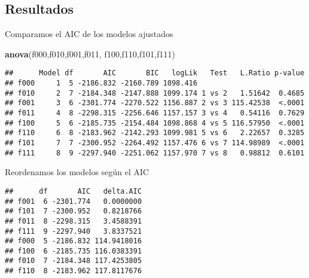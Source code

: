 \documentclass[]{article}
\newenvironment{Shaded}{\begin{snugshade}}{\end{snugshade}}
\newcommand{\DataTypeTok}[1]{\textcolor[rgb]{0.13,0.29,0.53}{#1}}
\newcommand{\DecValTok}[1]{\textcolor[rgb]{0.00,0.00,0.81}{#1}}
\newcommand{\KeywordTok}[1]{\textcolor[rgb]{0.13,0.29,0.53}{\textbf{#1}}}
\newcommand{\NormalTok}[1]{#1}
\newcommand{\OperatorTok}[1]{\textcolor[rgb]{0.81,0.36,0.00}{\textbf{#1}}}
\newcommand{\StringTok}[1]{\textcolor[rgb]{0.31,0.60,0.02}{#1}}
\begin{document}
\hypertarget{resultados}{%
\subsection{Resultados}\label{resultados}}

Comparamos el AIC de los modelos ajustados

\begin{Shaded}
\begin{Highlighting}[]
\KeywordTok{anova}\NormalTok{(f000,f010,f001,f011,}
\NormalTok{  f100,f110,f101,f111)}
\end{Highlighting}
\end{Shaded}

\begin{verbatim}
##      Model df       AIC       BIC   logLik   Test   L.Ratio p-value
## f000     1  5 -2186.832 -2160.789 1098.416                         
## f010     2  7 -2184.348 -2147.888 1099.174 1 vs 2   1.51642  0.4685
## f001     3  6 -2301.774 -2270.522 1156.887 2 vs 3 115.42538  <.0001
## f011     4  8 -2298.315 -2256.646 1157.157 3 vs 4   0.54116  0.7629
## f100     5  6 -2185.735 -2154.484 1098.868 4 vs 5 116.57950  <.0001
## f110     6  8 -2183.962 -2142.293 1099.981 5 vs 6   2.22657  0.3285
## f101     7  7 -2300.952 -2264.492 1157.476 6 vs 7 114.98989  <.0001
## f111     8  9 -2297.940 -2251.062 1157.970 7 vs 8   0.98812  0.6101
\end{verbatim}

Reordenamos los modelos según el AIC

\begin{Shaded}
\end{Shaded}

\begin{verbatim}
##      df       AIC   delta.AIC
## f001  6 -2301.774   0.0000000
## f101  7 -2300.952   0.8218766
## f011  8 -2298.315   3.4588391
## f111  9 -2297.940   3.8337521
## f000  5 -2186.832 114.9418016
## f100  6 -2185.735 116.0383391
## f010  7 -2184.348 117.4253805
## f110  8 -2183.962 117.8117676
\end{verbatim}
\end{document}
